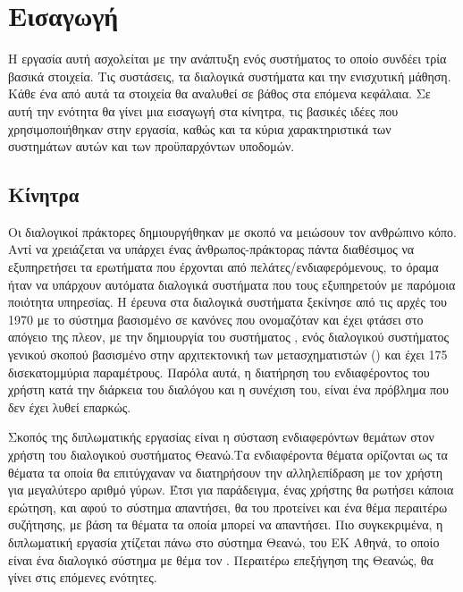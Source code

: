 \chapter{Εισαγωγή}

Η εργασία αυτή ασχολείται με την ανάπτυξη ενός συστήματος το οποίο συνδέει τρία βασικά στοιχεία. Τις συστάσεις, τα διαλογικά συστήματα και την ενισχυτική μάθηση. Κάθε ένα από αυτά τα στοιχεία θα αναλυθεί σε βάθος στα επόμενα κεφάλαια. Σε αυτή την ενότητα θα γίνει μια εισαγωγή στα κίνητρα, τις βασικές ιδέες που χρησιμοποιήθηκαν στην εργασία, καθώς και τα κύρια χαρακτηριστικά των συστημάτων αυτών και των προϋπαρχόντων υποδομών.


\section{Κίνητρα}

Οι διαλογικοί πράκτορες δημιουργήθηκαν με σκοπό να μειώσουν τον ανθρώπινο κόπο. Αντί να χρειάζεται να υπάρχει ένας άνθρωπος-πράκτορας πάντα διαθέσιμος να εξυπηρετήσει τα ερωτήματα που έρχονται από πελάτες/ενδιαφερόμενους, το όραμα ήταν να υπάρχουν αυτόματα διαλογικά συστήματα που τους εξυπηρετούν με παρόμοια ποιότητα υπηρεσίας. Η έρευνα στα διαλογικά συστήματα ξεκίνησε από τις αρχές του 1970 με το σύστημα βασισμένο σε κανόνες που ονομαζόταν  και έχει φτάσει στο απόγειο της πλεον, με την δημιουργία του συστήματος , ενός διαλογικού συστήματος γενικού σκοπού βασισμένο στην αρχιτεκτονική των μετασχηματιστών () και έχει 175 δισεκατομμύρια παραμέτρους. Παρόλα αυτά, η διατήρηση του ενδιαφέροντος του χρήστη κατά την διάρκεια του διαλόγου και η συνέχιση του, είναι ένα πρόβλημα που δεν έχει λυθεί επαρκώς.

Σκοπός της διπλωματικής εργασίας είναι η σύσταση ενδιαφερόντων θεμάτων στον χρήστη του διαλογικού συστήματος Θεανώ.Τα ενδιαφέροντα θέματα ορίζονται ως τα θέματα τα οποία θα επιτύγχαναν να διατηρήσουν την αλληλεπίδραση με τον χρήστη για μεγαλύτερο αριθμό γύρων. Έτσι για παράδειγμα, ένας χρήστης θα ρωτήσει κάποια ερώτηση, και αφού το σύστημα απαντήσει, θα του προτείνει και ένα θέμα περαιτέρω συζήτησης, με βάση τα θέματα τα οποία μπορεί να απαντήσει. Πιο συγκεκριμένα, η διπλωματική εργασία χτίζεται πάνω στο σύστημα Θεανώ, του ΕΚ Αθηνά, το οποίο είναι ένα διαλογικό σύστημα με θέμα τον . Περαιτέρω επεξήγηση της Θεανώς, θα γίνει στις επόμενες ενότητες.

